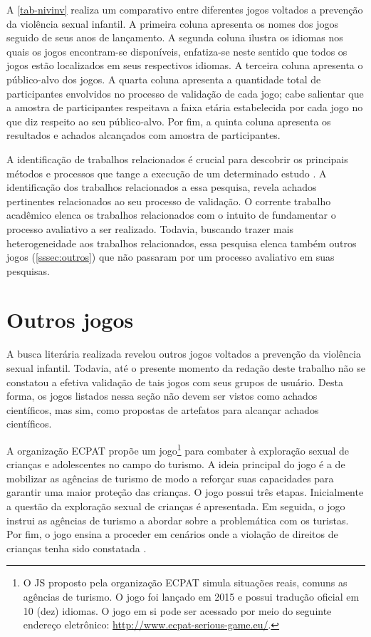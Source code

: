 A \autoref{tab-nivinv} realiza um comparativo entre diferentes jogos voltados a prevenção da violência sexual infantil. A primeira coluna apresenta os nomes dos jogos seguido de seus anos de lançamento. A segunda coluna ilustra os idiomas nos quais os jogos encontram-se disponíveis, enfatiza-se neste sentido que todos os jogos estão localizados em seus respectivos idiomas. A terceira coluna apresenta o público-alvo dos jogos. A quarta coluna apresenta a quantidade total de participantes envolvidos no processo de validação de cada jogo; cabe salientar que a amostra de participantes respeitava a faixa etária estabelecida por cada jogo no que diz respeito ao seu público-alvo. Por fim, a quinta coluna apresenta os resultados e achados alcançados com amostra de participantes. 

A identificação de trabalhos relacionados é crucial para descobrir os principais métodos e processos que tange a execução de um determinado estudo \cite{wazlawick2014metodologia}. A identificação dos trabalhos relacionados a essa pesquisa, revela achados pertinentes relacionados ao seu processo de validação. O corrente trabalho acadêmico elenca os trabalhos relacionados com o intuito de fundamentar o processo avaliativo a ser realizado. Todavia, buscando trazer mais heterogeneidade aos trabalhos relacionados, essa pesquisa elenca também outros jogos (\autoref{sssec:outros}) que não passaram por um processo avaliativo em suas pesquisas. 

\section{Outros jogos}\label{sssec:outros}

A busca literária realizada revelou outros jogos voltados a prevenção da violência sexual infantil. Todavia, até o presente momento da redação deste trabalho não se constatou a efetiva validação de tais jogos com seus grupos de usuário. Desta forma, os jogos listados nessa seção não devem ser vistos como achados científicos, mas sim, como propostas de artefatos para alcançar achados científicos.

A organização \ac{ECPAT} propõe um jogo\footnote{O \acf{JS} proposto pela organização \acf{ECPAT} simula situações reais, comuns as agências de turismo. O jogo foi lançado em 2015 e possui tradução oficial em 10 (dez) idiomas. O jogo em si pode ser acessado por meio do seguinte endereço eletrônico: \url{http://www.ecpat-serious-game.eu/}.} para combater à exploração sexual de crianças e adolescentes no campo do turismo. A ideia principal do jogo é a de mobilizar as agências de turismo de modo a reforçar suas capacidades para garantir uma maior proteção das crianças. O jogo possui três etapas. Inicialmente a questão da exploração sexual de crianças é apresentada. Em seguida, o jogo instrui as agências de turismo a abordar sobre a problemática com os turistas. Por fim, o jogo ensina a proceder em cenários onde a violação de direitos de crianças tenha sido constatada \cite{gopalan2018social}. 

